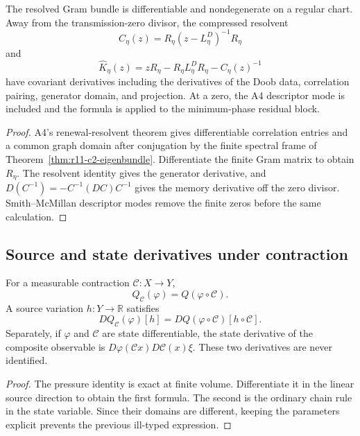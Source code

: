 \begin{theorem}
\label{thm:r11-c2-memory}
The resolved Gram bundle is differentiable and nondegenerate on a regular
chart.  Away from the transmission-zero divisor, the compressed resolvent
\[
 C_\eta(z)=R_\eta(z-L_\eta^D)^{-1}R_\eta
\]
and
\[
 \widehat K_\eta(z)=zR_\eta-R_\eta L_\eta^DR_\eta-C_\eta(z)^{-1}
\]
have covariant derivatives including the derivatives of the Doob data,
correlation pairing, generator domain, and projection.  At a zero, the A4
descriptor mode is included and the formula is applied to the minimum-phase
residual block.
\end{theorem}

\begin{proof}
A4's renewal-resolvent theorem gives differentiable correlation entries and a
common graph domain after conjugation by the finite spectral frame of
Theorem~\ref{thm:r11-c2-eigenbundle}.  Differentiate the finite Gram matrix to
obtain $R_\eta$.  The resolvent identity gives the generator derivative, and
$D(C^{-1})=-C^{-1}(DC)C^{-1}$ gives the memory derivative off the zero
divisor.  Smith--McMillan descriptor modes remove the finite zeros before the
same calculation.
\end{proof}

\subsection{Source and state derivatives under contraction}

\begin{theorem}
\label{thm:r11-c2-chain}
For a measurable contraction $\mathcal C:X\to Y$,
\[
 Q_{\mathcal C}(\varphi)=Q(\varphi\circ\mathcal C).
\]
A source variation $h:Y\to\mathbb R$ satisfies
\[
 DQ_{\mathcal C}(\varphi)[h]
 =DQ(\varphi\circ\mathcal C)[h\circ\mathcal C].
\]
Separately, if $\varphi$ and $\mathcal C$ are state differentiable, the state
derivative of the composite observable is
$D\varphi(\mathcal Cx)D\mathcal C(x)\xi$.  These two derivatives are never
identified.
\end{theorem}

\begin{proof}
The pressure identity is exact at finite volume.  Differentiate it in the
linear source direction to obtain the first formula.  The second is the
ordinary chain rule in the state variable.  Since their domains are different,
keeping the parameters explicit prevents the previous ill-typed expression.
\end{proof}

